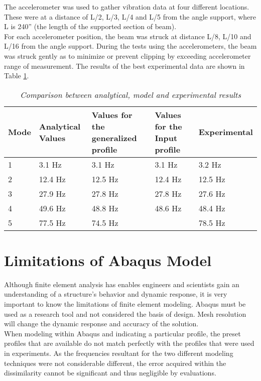 \indent The accelerometer was used to gather vibration data at four different locations. These were at a distance of L/2, L/3, L/4 and L/5 from the angle
support, where L is 240” (the length of the supported section of beam).\\
\indent For each accelerometer position, the beam was struck at distance L/8, L/10 and L/16 from the angle support. During the tests using the
accelerometers, the beam was struck gently as to minimize or prevent clipping by exceeding accelerometer range of measurement. The results of the best
experimental data are shown in Table \ref{tab:Results_Comp}.\\
\begin{table}
\begin{center}
\begin{tabular}{|l| p{3.5cm}| p{3cm}| p{3cm}| p{3cm}|}
\hline
\textbf{Mode} & \textbf{Analytical Values} & \textbf{Values for the generalized profile} & \textbf{Values for the Input profile} & \textbf{Experimental} \\\hline
1    & 3.1 Hz            & 3.1 Hz                             & 3.1 Hz                       & 3.2 Hz       \\\hline
2    & 12.4 Hz           & 12.5 Hz                            & 12.4 Hz                      & 12.5 Hz      \\\hline
3    & 27.9 Hz           & 27.8 Hz                            & 27.8 Hz                      & 27.6 Hz      \\\hline
4    & 49.6 Hz           & 48.8 Hz                            & 48.6 Hz                      & 48.4 Hz      \\\hline
5    & 77.5 Hz           & 74.5 Hz                            &                             & 78.5 Hz      \\\hline
\end{tabular}
\caption{\textit{Comparison between analytical, model and experimental results}}
\label{tab:Results_Comp}
\end{center}
\end{table}

\section{Limitations of Abaqus Model}
\indent Although finite element analysis has enables engineers and scientists gain an understanding of a structure’s behavior and dynamic response, it is
very important to know the limitations of finite element modeling. Abaqus must be used as a research tool and not considered the basis of design. Mesh
resolution will change the dynamic response and accuracy of the solution. \\

\indent When modeling within Abaqus and indicating a particular profile, the preset profiles that are available do not match perfectly with the profiles
that were used in experiments. As the frequencies resultant for the two different modeling techniques were not considerable different, the error acquired
within the dissimilarity cannot be significant and thus negligible by evaluations. \\
